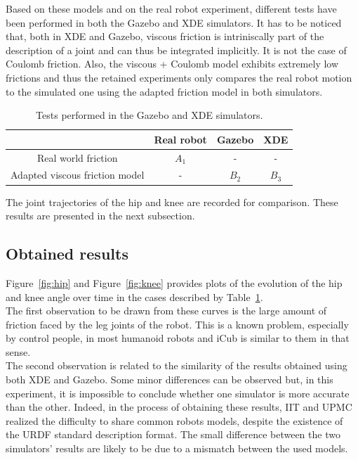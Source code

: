 \documentclass[12pt,a4paper,twoside]{article}
\begin{document}
Based on these models and on the real robot experiment, different tests have been performed in both the Gazebo and XDE simulators. It has to be noticed that, both in XDE and Gazebo, viscous friction is intriniscally part of the description of a joint and can thus be integrated implicitly. It is not the case of Coulomb friction. Also, the viscous + Coulomb model exhibits extremely low frictions and thus the retained experiments only compares the real robot motion to the simulated one using the adapted friction model in both simulators.\\

\begin{table}[h]
\begin{center}
\begin{tabular}{|c|c|c|c|}
\cline{2-4} 
\multicolumn{1}{c|}{} & Real robot & Gazebo & XDE\tabularnewline
\hline 
Real world friction & $A_1$ & - & -\tabularnewline
\hline 
Adapted viscous friction model & - & $B_2$ & $B_3$\tabularnewline
\hline 
\end{tabular}
\caption{Tests performed in the Gazebo and XDE simulators.}
\label{tab:simulator-tests}
\end{center}	
\end{table}

The joint trajectories of the hip and knee are recorded for comparison. These results are presented in the next subsection.

\subsection{Obtained results}

Figure~\ref{fig:hip} and Figure~\ref{fig:knee} provides plots of the evolution of the hip and knee angle over time in the cases described by Table~\ref{tab:simulator-tests}.\\

The first observation to be drawn from these curves is the large amount of friction faced by the leg joints of the robot. This is a known problem, especially by control people, in most humanoid robots and iCub is similar to them in that sense.\\

The second observation is related to the similarity of the results obtained using both XDE and Gazebo. Some minor differences can be observed but, in this experiment, it is impossible to conclude whether one simulator is more accurate than the other. Indeed, in the process of obtaining these results, IIT and UPMC realized the difficulty to share common robots models, despite the existence of the URDF standard description format. The small difference between the two simulators' results are likely to be due to a mismatch between the used models.\\
\end{document}
